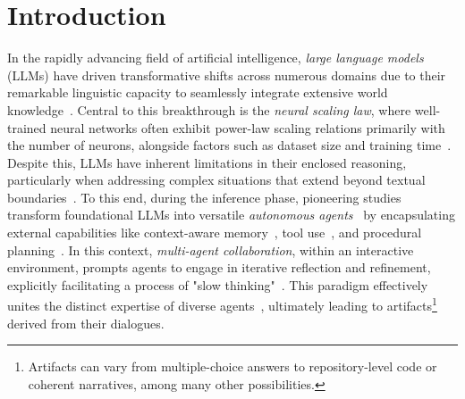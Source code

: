 \documentclass{article}
\begin{document}
\section{Introduction}
In the rapidly advancing field of artificial intelligence, \textit{large language models} (LLMs) have driven transformative shifts across numerous domains due to their remarkable linguistic capacity to seamlessly integrate extensive world knowledge~\citep{vaswani2017attention,NEURIPS2020_1457c0d6}.
Central to this breakthrough is the \textit{neural scaling law}, where well-trained neural networks often exhibit power-law scaling relations primarily with the number of neurons, alongside factors such as dataset size and training time~\citep{kaplan2020scaling,Muennighoff2024Scaling}.
Despite this, LLMs have inherent limitations in their enclosed reasoning, particularly when addressing complex situations that extend beyond textual boundaries~\citep{schick2023toolformer}.
To this end, during the inference phase, pioneering studies transform foundational LLMs into versatile \textit{autonomous agents}~\citep{AutoGPT,HuggingGPT} by encapsulating external capabilities like context-aware memory~\citep{park2023generative}, tool use~\citep{qin2023toolllm}, and procedural planning~\citep{Zhao2023Large}.
In this context, \textit{multi-agent collaboration}, within an interactive environment, prompts agents to engage in iterative reflection and refinement, explicitly facilitating a process of "slow thinking"~\citep{Daniel2017Thinking,OpenAI2024Learning}. This paradigm effectively unites the distinct expertise of diverse agents~\citep{qian2023communicative}, ultimately leading to artifacts\footnote{Artifacts can vary from multiple-choice answers to repository-level code or coherent narratives, among many other possibilities.} derived from their dialogues.
\end{document}
